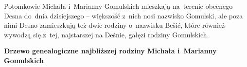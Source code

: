 \begin{figure}[!ht]
\end{figure}

Potomkowie Michała i~Marianny Gomulskich mieszkają na~terenie obecnego Desna
do~dnia dzisiejszego -- większość z~nich nosi nazwisko Gomulski, ale poza nimi
Desno zamieszkują też dwie rodziny o~nazwisku Bešić, które również wywodzą się
z~tej, najstarszej na Deśnie, gałęzi rodziny Gomulskich.

\newpage
\begin{center}
{\Large\bfseries Drzewo genealogiczne najbliższej rodziny Michała i~Marianny
Gomulskich}
\medskip


\end{center}
